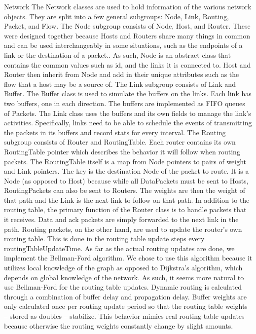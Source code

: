 \documentclass{article}
\begin{document}
Network
    The Network classes are used to hold information of the various network objects. They are split into a few general subgroups: Node, Link, Routing, Packet, and Flow.
The Node subgroup consists of Node, Host, and Router. These were designed together because Hosts and Routers share many things in common and can be used interchangeably in some situations, such as the endpoints of a link or the destination of a packet.. As such, Node is an abstract class that contains the common values such as id, and the links it is connected to. Host and Router then inherit from Node and add in their unique attributes such as the flow that a host may be a source of.
    The Link subgroup consists of Link and Buffer. The Buffer class is used to simulate the buffers on the links. Each link has two buffers, one in each direction. The buffers are implemented as FIFO queues of Packets. The Link class uses the buffers and its own fields to manage the link’s activities. Specifically, links need to be able to schedule the events of transmitting the packets in its buffers and record stats for every interval.
    The Routing subgroup consists of Router and RoutingTable. Each router contains its own RoutingTable pointer which describes the behavior it will follow when routing packets. The RoutingTable itself is a map from Node pointers to pairs of weight and Link pointers. The key is the destination Node of the packet to route. It is a Node (as opposed to Host) because while all DataPackets must be sent to Hosts, RoutingPackets can also be sent to Routers. The weights are then the weight of that path and the Link is the next link to follow on that path. In addition to the routing table, the primary function of the Router class is to handle packets that it receives. Data and ack packets are simply forwarded to the next link in the path. Routing packets, on the other hand, are used to update the router’s own routing table. This is done in the routing table update steps every routingTableUpdateTime. 
As far as the actual routing updates are done, we implement the Bellman-Ford algorithm. We chose to use this algorithm because it utilizes local knowledge of the graph as opposed to Dijkstra’s algorithm, which depends on global knowledge of the network. As such, it seems more natural to use Bellman-Ford for the routing table updates. Dynamic routing is calculated through a combination of buffer delay and propagation delay. Buffer weights are only calculated once per routing update period so that the routing table weights -- stored as doubles -- stabilize. This behavior mimics real routing table updates because otherwise the routing weights constantly change by slight amounts.
\end{document}
